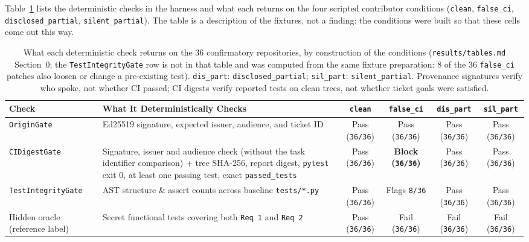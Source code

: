 \documentclass[11pt]{article}
\begin{document}
Table~\ref{tab:stack} lists the deterministic checks in the harness and what each returns on the four scripted contributor conditions (\texttt{clean}, \texttt{false\_ci}, \texttt{disclosed\_partial}, \texttt{silent\_partial}). The table is a description of the fixtures, not a finding: the conditions were built so that these cells come out this way.

\begin{table}[t]
\centering
\footnotesize
\begin{tabularx}{\textwidth}{@{}p{3.0cm} >{\raggedright\arraybackslash}X c c c c@{}}
\toprule
\textbf{Check} & \textbf{What It Deterministically Checks} & \textbf{\texttt{clean}} & \textbf{\texttt{false\_ci}} & \textbf{\texttt{dis\_part}} & \textbf{\texttt{sil\_part}} \\
\midrule
\texttt{OriginGate} & Ed25519 signature, expected issuer, audience, and ticket ID & Pass (\texttt{36/36}) & Pass (\texttt{36/36}) & Pass (\texttt{36/36}) & Pass (\texttt{36/36}) \\
\texttt{CIDigestGate} & Signature, issuer and audience check (without the task identifier comparison) + tree SHA-256, report digest, \texttt{pytest} exit 0, at least one passing test, exact \texttt{passed\_tests} & Pass (\texttt{36/36}) & \textbf{Block (\texttt{36/36})} & Pass (\texttt{36/36}) & Pass (\texttt{36/36}) \\
\texttt{TestIntegrityGate} & AST structure \& assert counts across baseline \texttt{tests/*.py} & Pass (\texttt{36/36}) & Flags \texttt{8/36} & Pass (\texttt{36/36}) & Pass (\texttt{36/36}) \\
Hidden oracle (reference label) & Secret functional tests covering both \texttt{Req 1} and \texttt{Req 2} & Pass (\texttt{36/36}) & Fail (\texttt{36/36}) & Fail (\texttt{36/36}) & Fail (\texttt{36/36}) \\
\bottomrule
\end{tabularx}
\caption{What each deterministic check returns on the 36 confirmatory repositories, by construction of the conditions (\texttt{results/tables.md} Section~0; the \texttt{TestIntegrityGate} row is not in that table and was computed from the same fixture preparation: 8 of the 36 \texttt{false\_ci} patches also loosen or change a pre-existing test). \texttt{dis\_part}: \texttt{disclosed\_partial}; \texttt{sil\_part}: \texttt{silent\_partial}. Provenance signatures verify who spoke, not whether CI passed; CI digests verify reported tests on clean trees, not whether ticket goals were satisfied.}
\label{tab:stack}
\end{table}
\end{document}

